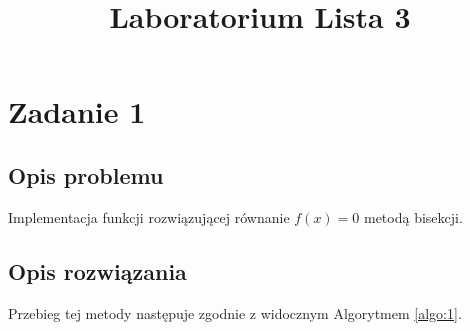 \documentclass{classrep}
\author{
  \studentinfo{Agata Jasionowska}{229726}
}
\title{Laboratorium \ppauza Lista 3}
\begin{document}
\maketitle

\section{Zadanie 1}
	\subsection{Opis problemu}
		Implementacja funkcji rozwiązującej równanie $f(x)=0$ metodą bisekcji.
	
	\subsection{Opis rozwiązania}
		Przebieg tej metody następuje zgodnie z widocznym Algorytmem \ref{algo:1}.
	
\end{document}
